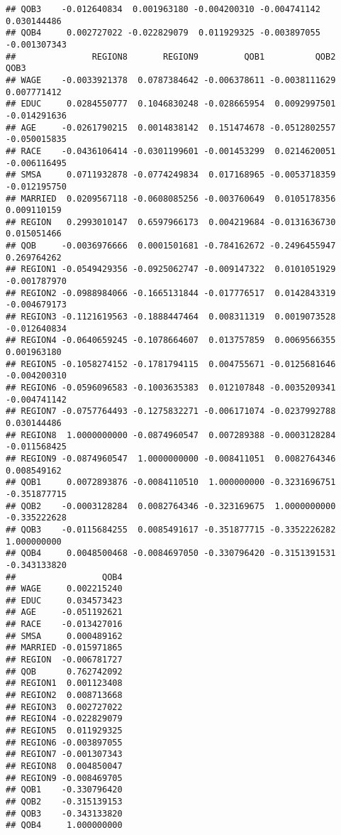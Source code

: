 \documentclass[
]{article}
\begin{document}
\begin{verbatim}
## QOB3    -0.012640834  0.001963180 -0.004200310 -0.004741142  0.030144486
## QOB4     0.002727022 -0.022829079  0.011929325 -0.003897055 -0.001307343
##               REGION8       REGION9         QOB1          QOB2         QOB3
## WAGE    -0.0033921378  0.0787384642 -0.006378611 -0.0038111629  0.007771412
## EDUC     0.0284550777  0.1046830248 -0.028665954  0.0092997501 -0.014291636
## AGE     -0.0261790215  0.0014838142  0.151474678 -0.0512802557 -0.050015835
## RACE    -0.0436106414 -0.0301199601 -0.001453299  0.0214620051 -0.006116495
## SMSA     0.0711932878 -0.0774249834  0.017168965 -0.0053718359 -0.012195750
## MARRIED  0.0209567118 -0.0608085256 -0.003760649  0.0105178356  0.009110159
## REGION   0.2993010147  0.6597966173  0.004219684 -0.0131636730  0.015051466
## QOB     -0.0036976666  0.0001501681 -0.784162672 -0.2496455947  0.269764262
## REGION1 -0.0549429356 -0.0925062747 -0.009147322  0.0101051929 -0.001787970
## REGION2 -0.0988984066 -0.1665131844 -0.017776517  0.0142843319 -0.004679173
## REGION3 -0.1121619563 -0.1888447464  0.008311319  0.0019073528 -0.012640834
## REGION4 -0.0640659245 -0.1078664607  0.013757859  0.0069566355  0.001963180
## REGION5 -0.1058274152 -0.1781794115  0.004755671 -0.0125681646 -0.004200310
## REGION6 -0.0596096583 -0.1003635383  0.012107848 -0.0035209341 -0.004741142
## REGION7 -0.0757764493 -0.1275832271 -0.006171074 -0.0237992788  0.030144486
## REGION8  1.0000000000 -0.0874960547  0.007289388 -0.0003128284 -0.011568425
## REGION9 -0.0874960547  1.0000000000 -0.008411051  0.0082764346  0.008549162
## QOB1     0.0072893876 -0.0084110510  1.000000000 -0.3231696751 -0.351877715
## QOB2    -0.0003128284  0.0082764346 -0.323169675  1.0000000000 -0.335222628
## QOB3    -0.0115684255  0.0085491617 -0.351877715 -0.3352226282  1.000000000
## QOB4     0.0048500468 -0.0084697050 -0.330796420 -0.3151391531 -0.343133820
##                 QOB4
## WAGE     0.002215240
## EDUC     0.034573423
## AGE     -0.051192621
## RACE    -0.013427016
## SMSA     0.000489162
## MARRIED -0.015971865
## REGION  -0.006781727
## QOB      0.762742092
## REGION1  0.001123408
## REGION2  0.008713668
## REGION3  0.002727022
## REGION4 -0.022829079
## REGION5  0.011929325
## REGION6 -0.003897055
## REGION7 -0.001307343
## REGION8  0.004850047
## REGION9 -0.008469705
## QOB1    -0.330796420
## QOB2    -0.315139153
## QOB3    -0.343133820
## QOB4     1.000000000
\end{verbatim}
\end{document}
